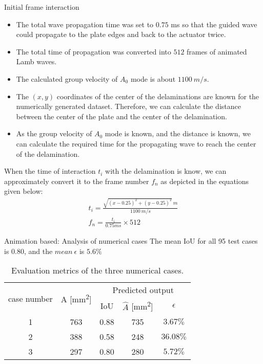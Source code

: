 \documentclass[10pt,aspectratio=169,dvipsnames]{beamer} %
\begin{document}
	\begin{frame}{Initial frame interaction}
		\begin{footnotesize}
			\begin{itemize}
				\item The total wave propagation time was set to \(0.75\) ms so that the guided wave could propagate to the plate edges and back to the actuator twice.
				\item The total time of propagation was converted into \(512\) frames of animated Lamb waves.
				\item The calculated group velocity of \(A_0\) mode is about \(1100\ m/s\).
				\item The \((x, y)\) coordinates of the center of the delaminations are known for the numerically generated dataset. 
				Therefore, we can calculate the distance between the center of the plate and the center of the delamination.
				\item As the group velocity of \(A_0\) mode is known, and the distance is known, we can calculate the required time for the propagating wave to reach the center of the delamination. 
			\end{itemize}
			
			When the time of interaction \(t_i\) with the delamination is know, we can approximately convert it to the frame number \(f_n\) as depicted in the equations given below:		
			\begin{gather*}
				t_i = \frac{\sqrt{(x-0.25)^2 +(y-0.25)^2} \ m}{1100\ m/s}
				\\
				f_n = \frac{t_i}{0.75ms} \times 512
			\end{gather*}
		\end{footnotesize}					
	\end{frame}
	\begin{frame}{Animation based: Analysis of numerical cases}
		The mean IoU for all 95 test cases is 0.80, and the \(mean\ \epsilon\) is \(5.6\%\)
		\begin{table}[!h]
			\centering
			\caption{Evaluation metrics of the three numerical cases.}
			\begin{tabular}{ccccc}
				\toprule[1.5pt]
				\multirow{2}{*}{case number} & \multicolumn{1}{c}{\multirow{2}{*}{A [mm\textsuperscript{2}]}} & \multicolumn{3}{c}{Predicted output} \\ 
				\cmidrule(lr){3-5} & & \multicolumn{1}{c}{IoU} & \multicolumn{1}{c}{\(\hat{A}\) [mm\textsuperscript{2}]} & \(\epsilon\) \\
				\midrule
				1 & 763 & \multicolumn{1}{c}{0.88} & \multicolumn{1}{c}{735} & \(3.67\%\) \\ 
				2 & 388 & \multicolumn{1}{c}{0.58} & \multicolumn{1}{c}{248} & \(36.08\%\) \\ 
				3 & 297 & \multicolumn{1}{c}{0.80} & \multicolumn{1}{c}{280} & \(5.72\%\) \\			 					
				\bottomrule[1.5pt]
			\end{tabular}	
			\label{tab:num_cases_}
		\end{table}			
	\end{frame}
\end{document}
